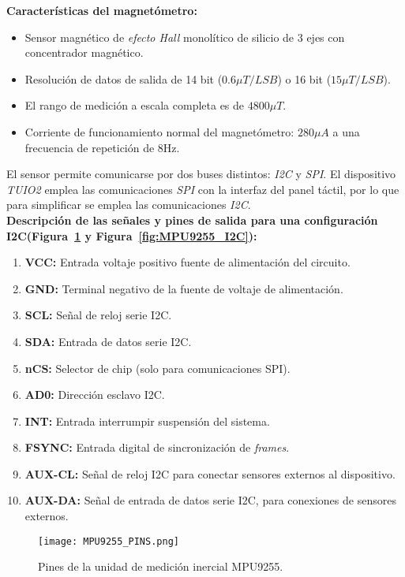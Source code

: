 \textbf{Características del magnetómetro:}
\begin{itemize}
\item Sensor magnético de \emph{efecto Hall} monolítico de silicio de 3 ejes con concentrador magnético.
\item Resolución de datos de salida de 14 bit ($0.6\mu T / LSB$) o 16 bit ($15\mu T / LSB$).
\item El rango de medición a escala completa es de  $4800\mu T$.
\item Corriente de funcionamiento normal del magnetómetro: $280\mu A$ a una frecuencia de repetición de 8Hz.
\end{itemize}


El sensor permite comunicarse por dos buses distintos: \emph{I2C} y \emph{SPI}. El dispositivo \emph{TUIO2} emplea las comunicaciones \emph{SPI} con la interfaz del panel táctil, por lo que para simplificar se emplea las comunicaciones \emph{I2C}.\\

\textbf{Descripción de las señales y pines de salida para una configuración I2C(Figura~\ref{fig:MPU9255_PINS} y Figura~\ref{fig:MPU9255_I2C}):}
\begin{enumerate}
\item \textbf{VCC:} Entrada voltaje positivo fuente de alimentación del circuito.
\item \textbf{GND:} Terminal negativo de la fuente de voltaje de alimentación.
\item \textbf{SCL:} Señal de reloj serie I2C.
\item \textbf{SDA:} Entrada de datos serie I2C.
\item \textbf{nCS:} Selector de chip (solo para comunicaciones SPI).
\item \textbf{AD0:} Dirección esclavo I2C.
\item \textbf{INT:} Entrada interrumpir suspensión del sistema.
\item \textbf{FSYNC:} Entrada digital de sincronización de \emph{frames}.
\item \textbf{AUX-CL:} Señal de reloj I2C para conectar sensores externos al dispositivo.
\item \textbf{AUX-DA:} Señal de entrada de datos serie I2C, para conexiones de sensores externos. 
\end{enumerate}

\begin{figure}[!h]
\begin{center}
\texttt{[image: MPU9255\_PINS.png]}
\caption{Pines de la unidad de medición inercial MPU9255.}
\label{fig:MPU9255_PINS}
\end{center}
\end{figure}

